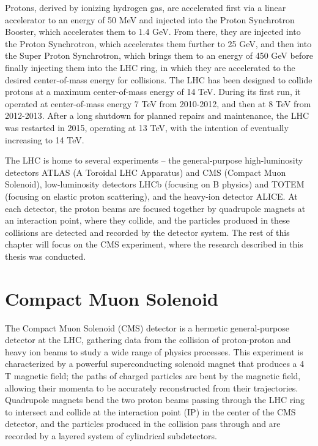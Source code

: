 Protons, derived by ionizing hydrogen gas, are accelerated first via a linear accelerator to an energy of 50 MeV and injected into the Proton Synchrotron Booster, which accelerates them to 1.4 GeV. From there, they are injected into the Proton Synchrotron, which accelerates them further to 25 GeV, and then into the Super Proton Synchrotron, which brings them to an energy of 450 GeV before finally injecting them into the LHC ring, in which they are accelerated to the desired center-of-mass energy for collisions. The LHC has been designed to collide protons at a maximum center-of-mass energy of 14 TeV. During its first run, it operated at center-of-mass energy 7 TeV from 2010-2012, and then at 8 TeV from 2012-2013. After a long shutdown for planned repairs and maintenance, the LHC was restarted in 2015, operating at 13 TeV, with the intention of eventually increasing to 14 TeV.

The LHC is home to several experiments -- the general-purpose high-luminosity detectors ATLAS (A Toroidal LHC Apparatus) and CMS (Compact Muon Solenoid), low-luminosity detectors LHCb (focusing on B physics) and TOTEM (focusing on elastic proton scattering), and the heavy-ion detector ALICE. At each detector, the proton beams are focused together by quadrupole magnets at an interaction point, where they collide, and the particles produced in these collisions are detected and recorded by the detector system. The rest of this chapter will focus on the CMS experiment, where the research described in this thesis was conducted.

\section{Compact Muon Solenoid\label{sec:cms}}

The Compact Muon Solenoid (CMS) detector is a hermetic general-purpose detector at the LHC, gathering data from the collision of proton-proton and heavy ion beams to study a wide range of physics processes. This experiment is characterized by a powerful superconducting solenoid magnet that produces a 4 T magnetic field; the paths of charged particles are bent by the magnetic field, allowing their momenta to be accurately reconstructed from their trajectories. Quadrupole magnets bend the two proton beams passing through the LHC ring to intersect and collide at the interaction point (IP) in the center of the CMS detector, and the particles produced in the collision pass through and are recorded by a layered system of cylindrical subdetectors.

